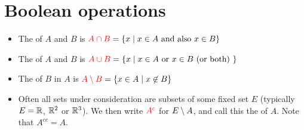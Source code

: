 \documentclass[a4paper]{book}
\theoremstyle{definition}
\begin{document}
\section{Boolean operations}\label{sec-boolean}

\begin{itemize}
  \item The  of $A$ and $B$ is
   ${\color{red}A\cap B}=\{x\;|\; x\in A \text{ and also } x\in B\}$
  \item The  of $A$ and $B$ is
   ${\color{red}A\cup B}=\{x\;|\; x\in A \text{ or } x\in B \text{ (or both) }\}$
  \item The  of $B$ in $A$ is
   ${\color{red}A\setminus B}=\{x\in A \;|\; x\not\in B\}$
  \item Often all sets under consideration are subsets of some fixed
   set $E$ (typically $E={\mathbb{R}}$, ${\mathbb{R}}^2$ or ${\mathbb{R}}^3$).  We then write
   ${\color{red}A^c}$ for $E\setminus A$, and call this the  of
   $A$.  Note that $A^{cc}=A$.
\end{itemize} 
\end{document}
